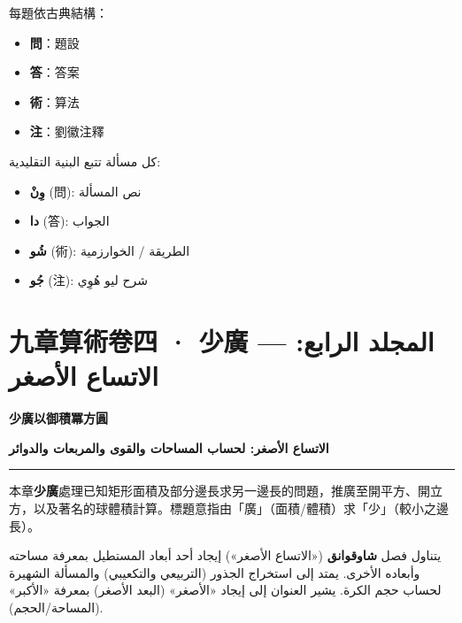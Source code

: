 \documentclass[11pt,a4paper]{article}
\newcommand{\ar}[1]{\arabicfont\beginR #1\endR}
\newcommand{\longline}{\noindent\rule{\textwidth}{0.4pt}}
\newcommand{\ChinCol}[1]{\begin{minipage}[t]{0.48\textwidth}#1\end{minipage}}
\newcommand{\ArabCol}[1]{\begin{minipage}[t]{0.48\textwidth}\arabicfont\beginR #1\endR\end{minipage}}
\newcommand{\parallelsection}[2]{%
  \noindent\ChinCol{#1}\hfill\ArabCol{#2}\par\vspace{0.5cm}%
}
\newcounter{probnum}
\begin{document}
\noindent
\begin{minipage}[t]{0.48\textwidth}
每題依古典結構：
\begin{itemize}[leftmargin=1.5em,topsep=0pt]
  \item \textbf{問}：題設
  \item \textbf{答}：答案
  \item \textbf{術}：算法
  \item \textbf{注}：劉徽注釋
\end{itemize}
\end{minipage}
\hfill
\begin{minipage}[t]{0.48\textwidth}
\arabicfont\beginR
كل مسألة تتبع البنية التقليدية:
\begin{itemize}[leftmargin=1.5em,topsep=0pt]
  \item \textbf{وِنْ} (問): نص المسألة
  \item \textbf{دا} (答): الجواب
  \item \textbf{شُو} (術): الطريقة / الخوارزمية
  \item \textbf{جُو} (注): شرح ليو هُوِي
\end{itemize}
\endR
\end{minipage}

\newpage

\setcounter{probnum}{0}

\section{九章算術卷四 · 少廣 — \ar{المجلد الرابع: الاتساع الأصغر}}
\label{sec:vol4}

\begin{center}
{\Large\bfseries\color{volcolor} 少廣以御積冪方圓}

\vspace{0.2cm}

{\fontsize{14}{18}\selectfont\arabicfont\beginR\color{volcolor}\textbf{الاتساع الأصغر: لحساب المساحات والقوى والمربعات والدوائر}\endR}
\end{center}

\vspace{0.3cm}
\longline
\vspace{0.3cm}

\parallelsection{本章\textbf{少廣}處理已知矩形面積及部分邊長求另一邊長的問題，推廣至開平方、開立方，以及著名的球體積計算。標題意指由「廣」（面積/體積）求「少」（較小之邊長）。}{يتناول فصل \textbf{شاوقوانق} («الاتساع الأصغر») إيجاد أحد أبعاد المستطيل بمعرفة مساحته وأبعاده الأخرى. يمتد إلى استخراج الجذور (التربيعي والتكعيبي) والمسألة الشهيرة لحساب حجم الكرة. يشير العنوان إلى إيجاد «الأصغر» (البعد الأصغر) بمعرفة «الأكبر» (المساحة/الحجم).}
\end{document}
